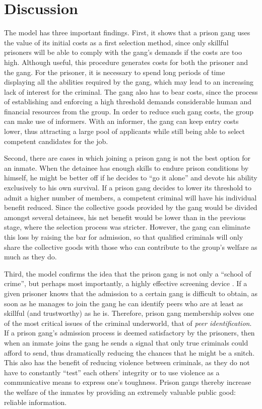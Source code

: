 \documentclass[a4paper,12pt]{article}
\begin{document}
\section{Discussion}

The model has three important findings. First, it shows that a prison gang uses the value of its initial costs as a first selection method, since only skillful prisoners will be able to comply with the gang's demands if the costs are too high. Although useful, this procedure generates costs for both the prisoner and the gang. For the prisoner, it is necessary to spend long periods of time displaying all the abilities required by the gang, which may lead to an increasing lack of interest for the criminal. The gang also has to bear costs, since the process of establishing and enforcing a high threshold demands considerable human and financial resources from the group. In order to reduce such gang costs, the group can make use of informers. With an informer, the gang can keep entry costs lower, thus attracting a large pool of applicants while still being able to select competent candidates for the job. 

Second, there are cases in which joining a prison gang is not the best option for an inmate. When the detainee has enough skills to endure prison conditions by himself, he might be better off if he decides to ``go it alone'' and devote his ability exclusively to his own survival. If a prison gang decides to lower its threshold to admit a higher number of members, a competent criminal will have his individual benefit reduced. Since the collective goods provided by the gang would be divided amongst several detainees, his net benefit would be lower than in the previous stage, where the selection process was stricter. However, the gang can eliminate this loss by raising the bar for admission, so that qualified criminals will only share the collective goods with those who can contribute to the group's welfare as much as they do. 

Third, the model confirms the idea that the prison gang is not only a ``school of crime'', but perhaps most importantly, a highly effective screening device \citep[]{gambetta2009codes}. If a given prisoner knows that the admission to a certain gang is difficult to obtain, as soon as he manages to join the gang he can identify peers who are at least as skillful (and trustworthy) as he is. Therefore, prison gang membership solves one of the most critical issues of the criminal underworld, that of \textit{peer identification}. If a prison gang's admission process is deemed satisfactory by the prisoners, then when an inmate joins the gang he sends a signal that only true criminals could afford to send, thus dramatically reducing the chances that he might be a snitch. This also has the benefit of reducing violence between criminals, as they do not have to constantly ``test'' each others' integrity or to use violence as a communicative means to express one's toughness. Prison gangs thereby increase the welfare of the inmates by providing an extremely valuable public good: reliable information.
\end{document}

